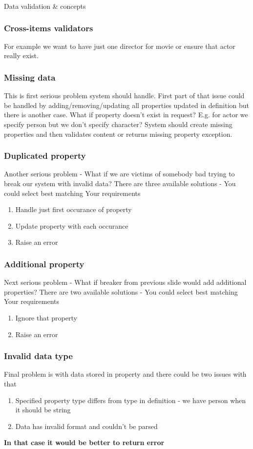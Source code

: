 \documentclass{beamer}
\begin{document}
\begin{section}{Data validation \& concepts}
\begin{frame}
\end{frame}

\begin{frame}
\frametitle{Cross-items validators}
For example we want to have just one director for movie or ensure that actor really exist.
\end{frame}

\begin{frame}
\frametitle{Missing data}
This is first serious problem system should handle. First part of that issue could be handled by adding/removing/updating all properties updated in definition but there is another case. \newline \pause
What if property doesn't exist in request? \pause E.g. for actor we specify person but we don't specify character? \pause
System should create missing properties and then validates content or returns missing property exception.
\end{frame}

\begin{frame}
\frametitle{Duplicated property}
Another serious problem - \pause What if we are victims of somebody bad trying to break our system with invalid data? \pause \newline
There are three available solutions - You could select best matching Your requirements \pause \newline
\begin{enumerate}
	\item Handle just first occurance of property \pause
	\item Update property with each occurance \pause
	\item Raise an error
\end{enumerate}
\end{frame}

\begin{frame}
\frametitle{Additional property}
Next serious problem - \pause What if breaker from previous slide would add additional properties? \pause \newline
There are two available solutions - You could select best matching Your requirements \pause \newline
\begin{enumerate}
	\item Ignore that property \pause
	\item Raise an error
\end{enumerate}
\end{frame}

\begin{frame}
\frametitle{Invalid data type}
Final problem is with data stored in property and there could be two issues with that \pause
\begin{enumerate}
	\item Specified property type differs from type in definition - \pause we have person when it should be string \pause
	\item Data has invalid format and couldn't be parsed \pause
\end{enumerate}
\pause
\textbf{In that case it would be better to return error}
\end{frame}


\end{section}
\end{document}
